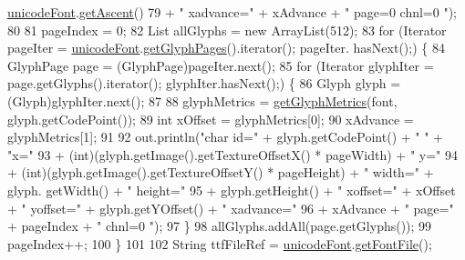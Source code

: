\begin{DoxyCode}
      \mbox{\hyperlink{classorg_1_1newdawn_1_1slick_1_1tools_1_1hiero_1_1_b_m_font_util_aabb529febc55852008fc0d4436186dd3}{unicodeFont}}.\mbox{\hyperlink{classorg_1_1newdawn_1_1slick_1_1_unicode_font_a72ed12d1f5f60d5352f1f1bcdbd6df28}{getAscent}}()
79             + \textcolor{stringliteral}{"    xadvance="} + xAdvance + \textcolor{stringliteral}{"     page=0  chnl=0 "});
80 
81         pageIndex = 0;
82         List allGlyphs = \textcolor{keyword}{new} ArrayList(512);
83         \textcolor{keywordflow}{for} (Iterator pageIter = \mbox{\hyperlink{classorg_1_1newdawn_1_1slick_1_1tools_1_1hiero_1_1_b_m_font_util_aabb529febc55852008fc0d4436186dd3}{unicodeFont}}.\mbox{\hyperlink{classorg_1_1newdawn_1_1slick_1_1_unicode_font_a04594e2bc110dd31237e54caea2cfb78}{getGlyphPages}}().iterator(); pageIter.
      hasNext();) \{
84             GlyphPage page = (GlyphPage)pageIter.next();
85             \textcolor{keywordflow}{for} (Iterator glyphIter = page.getGlyphs().iterator(); glyphIter.hasNext();) \{
86                 Glyph glyph = (Glyph)glyphIter.next();
87 
88                 glyphMetrics = \mbox{\hyperlink{classorg_1_1newdawn_1_1slick_1_1tools_1_1hiero_1_1_b_m_font_util_a103b65a81fd522188bc0fd1401fd13f5}{getGlyphMetrics}}(font, glyph.getCodePoint());
89                 \textcolor{keywordtype}{int} xOffset = glyphMetrics[0];
90                 xAdvance = glyphMetrics[1];
91 
92                 out.println(\textcolor{stringliteral}{"char id="} + glyph.getCodePoint() + \textcolor{stringliteral}{"   "} + \textcolor{stringliteral}{"x="}
93                     + (int)(glyph.getImage().getTextureOffsetX() * pageWidth) + \textcolor{stringliteral}{"     y="}
94                     + (\textcolor{keywordtype}{int})(glyph.getImage().getTextureOffsetY() * pageHeight) + \textcolor{stringliteral}{"     width="} + glyph.
      getWidth() + \textcolor{stringliteral}{"     height="}
95                     + glyph.getHeight() + \textcolor{stringliteral}{"     xoffset="} + xOffset + \textcolor{stringliteral}{"     yoffset="} + glyph.getYOffset() 
      + \textcolor{stringliteral}{"    xadvance="}
96                     + xAdvance + \textcolor{stringliteral}{"     page="} + pageIndex + \textcolor{stringliteral}{"  chnl=0 "});
97             \}
98             allGlyphs.addAll(page.getGlyphs());
99             pageIndex++;
100         \}
101 
102         String ttfFileRef = \mbox{\hyperlink{classorg_1_1newdawn_1_1slick_1_1tools_1_1hiero_1_1_b_m_font_util_aabb529febc55852008fc0d4436186dd3}{unicodeFont}}.\mbox{\hyperlink{classorg_1_1newdawn_1_1slick_1_1_unicode_font_a569a6742eb931a0d9d21a14ca7a0d7c4}{getFontFile}}();

\end{DoxyCode}
